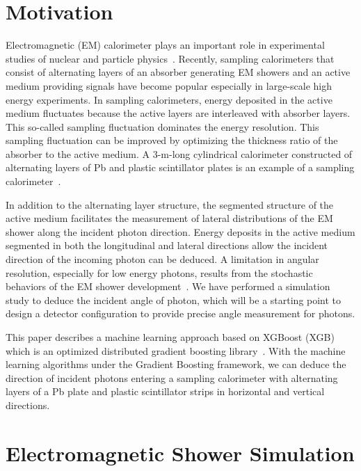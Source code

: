 \documentclass[preprint,12pt,times,a4paper]{elsarticle}
\begin{document}
\section{Motivation}
\label{sec:mot}
Electromagnetic (EM) calorimeter plays an important role in experimental studies of nuclear and particle physics~\cite{KOTO:MB, CMS:EMCAL, BELLE:EMCAL}. Recently, sampling calorimeters that consist of alternating layers of an absorber generating EM showers and an active medium providing signals have become popular especially in large-scale high energy experiments. In sampling calorimeters, energy deposited in the active medium fluctuates because the active layers are interleaved with absorber layers. This so-called sampling fluctuation dominates the energy resolution. This sampling fluctuation can be improved by optimizing the thickness ratio of the absorber to the active medium. A 3-m-long cylindrical calorimeter constructed of alternating layers of Pb and plastic scintillator plates is an example of a sampling calorimeter~\cite{Murayama:2020mcp}.

In addition to the alternating layer structure, the segmented structure of the active medium facilitates the measurement of lateral distributions of the EM shower along the incident photon direction. Energy deposits in the active medium segmented in both the longitudinal and lateral directions allow the incident direction of the incoming photon can be deduced. A limitation in angular resolution, especially for low energy photons, results from the stochastic behaviors of the EM shower development~\cite{trk:ref}. We have performed a simulation study to deduce the incident angle of photon, which will be a starting point to design a detector configuration to provide precise angle measurement for photons.

This paper describes a machine learning approach based on XGBoost (XGB) which is an optimized distributed gradient boosting library~\cite{xgboost:2016}. With the machine learning algorithms under the Gradient Boosting framework, we can deduce the direction of incident photons entering a sampling calorimeter with alternating layers of a Pb plate and plastic scintillator strips in horizontal and vertical directions.

\section{Electromagnetic Shower Simulation}
\label{sec:ems}
\end{document}
